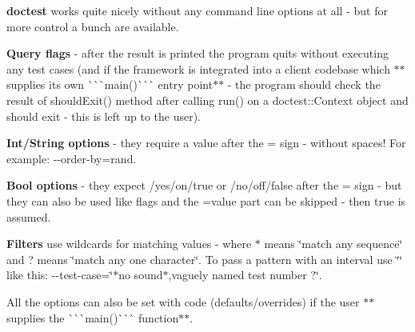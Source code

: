 {\bfseries{doctest}} works quite nicely without any command line options at all -\/ but for more control a bunch are available.

{\bfseries{Query flags}} -\/ after the result is printed the program quits without executing any test cases (and if the framework is integrated into a client codebase which $\ast$$\ast$supplies it\textquotesingle{}s own \`{}\`{}\`{}main()\`{}\`{}\`{} entry point$\ast$$\ast$ -\/ the program should check the result of {\ttfamily should\+Exit()} method after calling {\ttfamily run()} on a {\ttfamily doctest\+::\+Context} object and should exit -\/ this is left up to the user).

{\bfseries{Int/\+String options}} -\/ they require a value after the {\ttfamily =} sign -\/ without spaces! For example\+: {\ttfamily -\/-\/order-\/by=rand}.

{\bfseries{Bool options}} -\/ they expect {}/{\ttfamily yes}/{\ttfamily on}/{\ttfamily true} or {}/{\ttfamily no}/{\ttfamily off}/{\ttfamily false} after the {\ttfamily =} sign -\/ but they can also be used like flags and the {\ttfamily =value} part can be skipped -\/ then {\ttfamily true} is assumed. ~\newline


{\bfseries{Filters}} use wildcards for matching values -\/ where {\ttfamily $\ast$} means \char`\"{}match any sequence\char`\"{} and {\ttfamily ?} means \char`\"{}match any one character\char`\"{}. To pass a pattern with an interval use {\ttfamily \char`\"{}\char`\"{}} like this\+: {\ttfamily -\/-\/test-\/case=\char`\"{}$\ast$no sound$\ast$,vaguely named test number ?\char`\"{}}.

All the options can also be set with code (defaults/overrides) if the user $\ast$$\ast$supplies the \`{}\`{}\`{}main()\`{}\`{}\`{} function$\ast$$\ast$.


